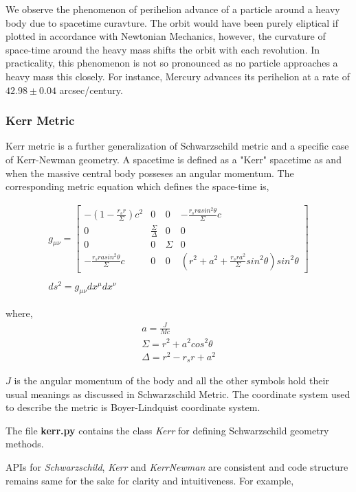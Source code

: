 \documentclass{aastex63}
\begin{document}
We observe the phenomenon of perihelion advance of a particle around a heavy body due to spacetime curavture. The orbit would have been purely eliptical if plotted in accordance with Newtonian Mechanics, however, the curvature of space-time around the heavy mass shifts the orbit with each revolution. In practicality, this phenomenon is not so pronounced as no particle approaches a heavy mass this closely. For instance, Mercury advances its perihelion at a rate of $42.98\pm 0.04$ arcsec/century.

\subsubsection{Kerr Metric}
Kerr metric is a further generalization of Schwarzschild metric and a specific case of Kerr-Newman geometry. A spacetime is defined as a "Kerr" spacetime as and when the massive central body posseses an angular momentum. The corresponding metric equation which defines the space-time is,

\begin{gather}
g_{\mu \nu} = \begin{bmatrix} - (1 - \frac{r_s r}{\Sigma})c^2 & 0 & 0 & -\frac{r_s r a sin^2 \theta}{\Sigma}c \\ 0 & \frac{\Sigma}{\Delta} & 0 & 0 \\ 0 & 0 & \Sigma & 0 \\ -\frac{r_s r a sin^2 \theta}{\Sigma}c & 0 & 0 &  (r^2 + a^2 + \frac{r_s r a^2}{\Sigma}sin^2 \theta) sin^2 \theta \end{bmatrix} \\ 
\nonumber \\
ds^2 = g_{\mu \nu} dx^\mu dx^\nu
\end{gather}

where,
\begin{gather}
a = \frac{J}{Mc} \\
\Sigma = r^2 + a^2 cos^2 \theta \\
\Delta  = r^2 - r_s r + a^2
\end{gather}

$J$ is the angular momentum of the body and all the other symbols hold their usual meanings as discussed in Schwarzschild Metric. The coordinate system used to describe the metric is Boyer-Lindquist coordinate system.

The file \textbf{kerr.py} contains the class \textit{Kerr} for defining Schwarzschild geometry methods.

APIs for \textit{Schwarzschild}, \textit{Kerr} and \textit{KerrNewman} are consistent and code structure remains same for the sake for clarity and intuitiveness. For example,
\end{document}
